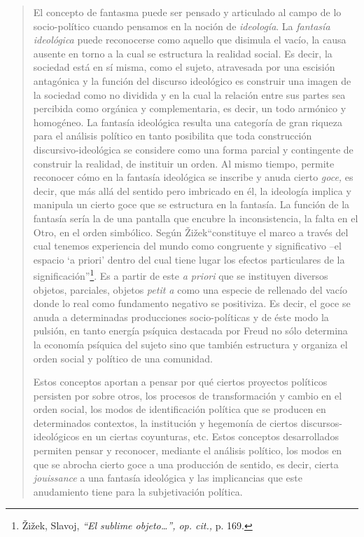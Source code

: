 \begin{quote}
El concepto de fantasma puede ser pensado y articulado al campo de lo socio-político cuando pensamos en la noción de \emph{ideología}. La \emph{fantasía ideológica} puede reconocerse como aquello que disimula el vacío, la causa ausente en torno a la cual se estructura la realidad social. Es decir, la sociedad está en sí misma, como el sujeto, atravesada por una escisión antagónica y la función del discurso ideológico es construir una imagen de la sociedad como no dividida y en la cual la relación entre sus partes sea percibida como orgánica y complementaria, es decir, un todo armónico y homogéneo. La fantasía ideológica resulta una categoría de gran riqueza para el análisis político en tanto posibilita que toda construcción discursivo-ideológica se considere como una forma parcial y contingente de construir la realidad, de instituir un orden. Al mismo tiempo, permite reconocer cómo en la fantasía ideológica se inscribe y anuda cierto \emph{goce,} es decir, que más allá del sentido pero imbricado en él, la ideología implica y manipula un cierto goce que se estructura en la fantasía. La función de la fantasía sería la de una pantalla que encubre la inconsistencia, la falta en el Otro, en el orden simbólico. Según Žižek\enquote{constituye el marco a través del cual tenemos experiencia del mundo como congruente y significativo --el espacio \enquote{a priori} dentro del cual tiene lugar los efectos particulares de la significación}\footnote{Žižek, Slavoj, \emph{\enquote{El sublime objeto\ldots}, op. cit.,} p. 169.}. Es a partir de este \emph{a priori} que se instituyen diversos objetos, parciales, objetos \emph{petit a} como una especie de rellenado del vacío donde lo real como fundamento negativo se positiviza. Es decir, el goce se anuda a determinadas producciones socio-políticas y de éste modo la pulsión, en tanto energía psíquica destacada por Freud no sólo determina la economía psíquica del sujeto sino que también estructura y organiza el orden social y político de una comunidad.

Estos conceptos aportan a pensar por qué ciertos proyectos políticos persisten por sobre otros, los procesos de transformación y cambio en el orden social, los modos de identificación política que se producen en determinados contextos, la institución y hegemonía de ciertos discursos-ideológicos en un ciertas coyunturas, etc. Estos conceptos desarrollados permiten pensar y reconocer, mediante el análisis político, los modos en que se abrocha cierto goce a una producción de sentido, es decir, cierta \emph{jouissance} a una fantasía ideológica y las implicancias que este anudamiento tiene para la subjetivación política.


\end{quote}
